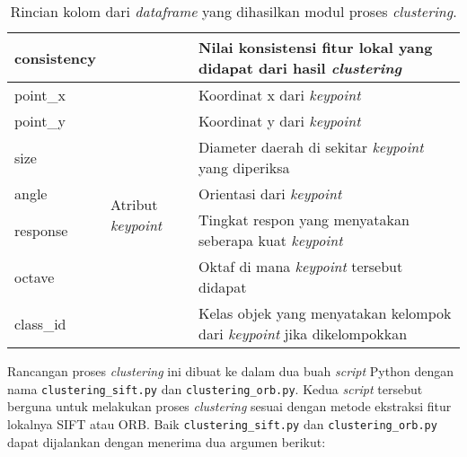 \begin{table}[H]
\begin{tabular}{|p{}|p{}|p{}|}
		consistency     &                                           & Nilai konsistensi fitur lokal yang didapat dari hasil \textit{clustering}                                            \\ \hline
		point\_x    & \multirow{7}{*}{Atribut \textit{keypoint}}         & Koordinat x dari \textit{keypoint}                                                                                   \\ \cline{1-1} \cline{3-3} 
		point\_y    &                                           & Koordinat y dari \textit{keypoint}                                                                                   \\ \cline{1-1} \cline{3-3} 
		size            &                                           & Diameter daerah di sekitar \textit{keypoint} yang diperiksa                                                          \\ \cline{1-1} \cline{3-3} 
		angle           &                                           & Orientasi dari \textit{keypoint}                                                                                     \\ \cline{1-1} \cline{3-3} 
		response        &                                           & Tingkat respon yang menyatakan seberapa kuat \textit{keypoint}                                                       \\ \cline{1-1} \cline{3-3} 
		octave          &                                           & Oktaf di mana \textit{keypoint} tersebut didapat                                                                     \\ \cline{1-1} \cline{3-3} 
		class\_id       &                                           & Kelas objek yang menyatakan kelompok dari \textit{keypoint} jika dikelompokkan                                       \\ \hline
	\end{tabular}
	\caption{Rincian kolom dari \textit{dataframe} yang dihasilkan modul proses \textit{clustering}.}
	\label{tab:df_clustering}
\end{table}
Rancangan proses \textit{clustering} ini dibuat ke dalam dua buah \textit{script} Python dengan nama \texttt{clustering\_sift.py} dan \texttt{clustering\_orb.py}. Kedua \textit{script} tersebut berguna untuk melakukan proses \textit{clustering} sesuai dengan metode ekstraksi fitur lokalnya SIFT atau ORB. Baik \texttt{clustering\_sift.py} dan \texttt{clustering\_orb.py} dapat dijalankan dengan menerima dua argumen berikut:

